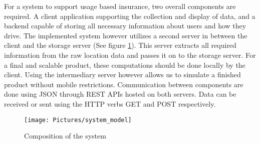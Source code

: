 For a system to support usage based insurance, two overall components are required. A client application supporting the collection and display of data, and a backend capable of storing all necessary information about users and how they drive. The implemented system however utilizes a second server in between the client and the storage server (See figure \ref{fig:system_model}). This server extracts all required information from the raw location data and passes it on to the storage server. For a final and scalable product, these computations should be done locally by the client. Using the intermediary server however allows us to simulate a finished product without mobile restrictions. Communication between components are done using JSON through REST APIs hosted on both servers. Data can be received or sent using the HTTP verbs GET and POST respectively.

\begin{figure}[tb]
\centering
\texttt{[image: Pictures/system\_model]}
\caption{Composition of the system}
\label{fig:system_model}
\end{figure}